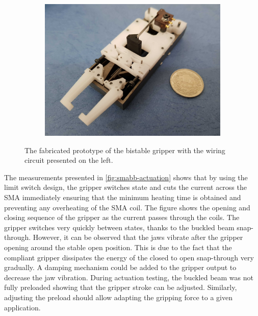 \begin{figure}[h!]
\begin{subfigure}[b]{0.27\textwidth}
  \end{subfigure}
  \begin{subfigure}[b]{0.72\textwidth}
      \includegraphics[width=\textwidth]{images/chap7/smabb-proto-iso.jpg}
  \end{subfigure}
  \caption{The fabricated prototype of the bistable gripper with the wiring circuit presented on the left.}
  \label{fig:final-prototype}
\end{figure}

The measurements presented in \cref{fig:smabb-actuation} shows that by using the limit switch design, the gripper switches state and cuts the current across the SMA immediately ensuring that the minimum heating time is obtained and preventing any overheating of the SMA coil. The figure shows the opening and closing sequence of the gripper as the current passes through the coils. The gripper switches very quickly between states, thanks to the buckled beam snap-through. However, it can be observed that the jaws vibrate after the gripper opening around the stable open position. This is due to the fact that the compliant gripper dissipates the energy of the closed to open snap-through very gradually. A damping mechanism could be added to the gripper output to decrease the jaw vibration. During actuation testing, the buckled beam was not fully preloaded showing that the gripper stroke can be adjusted. Similarly, adjusting the preload should allow adapting the gripping force to a given application.


